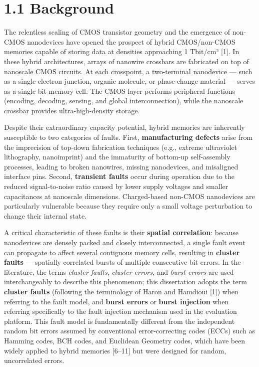 \documentclass[
  12pt,
  a4paper]{report}
\begin{document}
\section{1.1 Background}\label{background}

The relentless scaling of CMOS transistor geometry and the emergence of
non-CMOS nanodevices have opened the prospect of hybrid CMOS/non-CMOS
memories capable of storing data at densities approaching 1 Tbit/cm²
{[}1{]}. In these hybrid architectures, arrays of nanowire crossbars are
fabricated on top of nanoscale CMOS circuits. At each crosspoint, a
two-terminal nanodevice --- such as a single-electron junction, organic
molecule, or phase-change material --- serves as a single-bit memory
cell. The CMOS layer performs peripheral functions (encoding, decoding,
sensing, and global interconnection), while the nanoscale crossbar
provides ultra-high-density storage.

Despite their extraordinary capacity potential, hybrid memories are
inherently susceptible to two categories of faults. First,
\textbf{manufacturing defects} arise from the imprecision of top-down
fabrication techniques (e.g., extreme ultraviolet lithography,
nanoimprint) and the immaturity of bottom-up self-assembly processes,
leading to broken nanowires, missing nanodevices, and misaligned
interface pins. Second, \textbf{transient faults} occur during operation
due to the reduced signal-to-noise ratio caused by lower supply voltages
and smaller capacitances at nanoscale dimensions. Charged-based non-CMOS
nanodevices are particularly vulnerable because they require only a
small voltage perturbation to change their internal state.

A critical characteristic of these faults is their \textbf{spatial
correlation}: because nanodevices are densely packed and closely
interconnected, a single fault event can propagate to affect several
contiguous memory cells, resulting in \textbf{cluster faults} ---
spatially correlated bursts of multiple consecutive bit errors. In the
literature, the terms \emph{cluster faults}, \emph{cluster errors}, and
\emph{burst errors} are used interchangeably to describe this
phenomenon; this dissertation adopts the term \textbf{cluster faults}
(following the terminology of Haron and Hamdioui {[}1{]}) when referring
to the fault model, and \textbf{burst errors} or \textbf{burst
injection} when referring specifically to the fault injection mechanism
used in the evaluation platform. This fault model is fundamentally
different from the independent random bit errors assumed by conventional
error-correcting codes (ECCs) such as Hamming codes, BCH codes, and
Euclidean Geometry codes, which have been widely applied to hybrid
memories {[}6--11{]} but were designed for random, uncorrelated errors.
\end{document}
